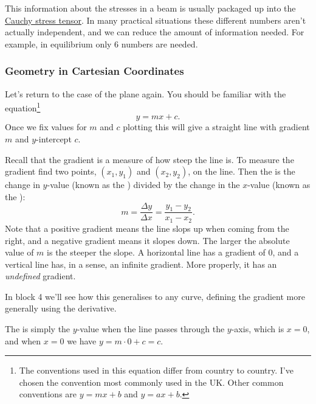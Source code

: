 \documentclass[fleqn]{LectureClass/LectureClass}
\begin{document}
    \begin{remark}{}{}
        This information about the stresses in a beam is usually packaged up into the \href{https://en.wikipedia.org/wiki/Cauchy_stress_tensor}{Cauchy stress tensor}.
        In many practical situations these different numbers aren't actually independent, and we can reduce the amount of information needed.
        For example, in equilibrium only 6 numbers are needed.
    \end{remark}
     
    \subsubsection{Geometry in Cartesian Coordinates}
    Let's return to the case of the plane again.
    You should be familiar with the equation\footnote{The conventions used in this equation differ from country to country. I've chosen the convention most commonly used in the UK. Other common conventions are \(y = mx + b\) and \(y = ax + b\).}
    \begin{equation}
        y = mx + c.
    \end{equation}
    Once we fix values for \(m\) and \(c\) plotting this will give a straight line with gradient \(m\) and \(y\)-intercept \(c\).
     
    Recall that the gradient is a measure of how steep the line is.
    To measure the gradient find two points, \((x_1, y_1)\) and \((x_2, y_2)\), on the line.
    Then the  is the change in \(y\)-value (known as the ) divided by the change in the \(x\)-value (known as the ):
    \begin{equation}
        m = \frac{\Delta y}{\Delta x} = \frac{y_1 - y_2}{x_1 - x_2}.
    \end{equation}
    Note that a positive gradient means the line slops up when coming from the right, and a negative gradient means it slopes down.
    The larger the absolute value of \(m\) is the steeper the slope.
    A horizontal line has a gradient of \(0\), and a vertical line has, in a sense, an infinite gradient.
    More properly, it has an \emph{undefined} gradient.
     
    \begin{remark}{}{}
        In block 4 we'll see how this generalises to any curve, defining the gradient more generally using the derivative.
    \end{remark}
     
    The  is simply the \(y\)-value when the line passes through the \(y\)-axis, which is \(x = 0\), and when \(x = 0\) we have \(y = m \cdot 0 + c = c\).
     
\end{document}
